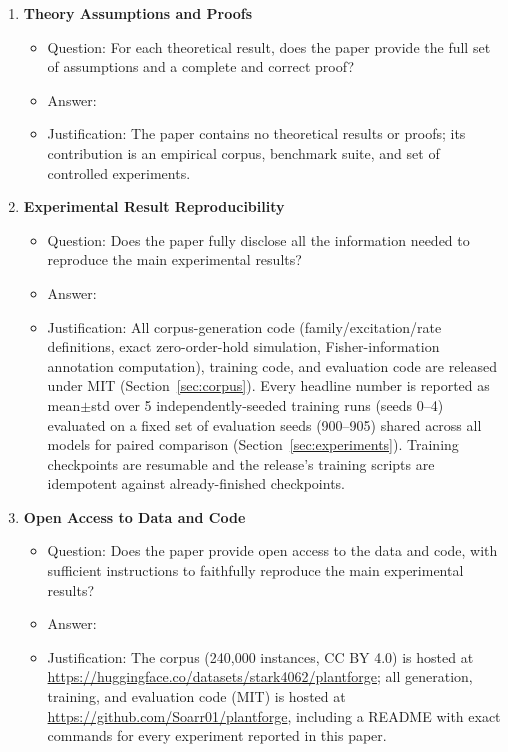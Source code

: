 \documentclass{article}
\begin{document}
\begin{enumerate}
\item {\bf Theory Assumptions and Proofs}
  \begin{itemize}
    \item Question: For each theoretical result, does the paper provide the full set of assumptions and a complete and correct proof?
    \item Answer: \answerNA{}
    \item Justification: The paper contains no theoretical results or proofs; its contribution is an empirical corpus, benchmark suite, and set of controlled experiments.
  \end{itemize}

\item {\bf Experimental Result Reproducibility}
  \begin{itemize}
    \item Question: Does the paper fully disclose all the information needed to reproduce the main experimental results?
    \item Answer: \answerYes{}
    \item Justification: All corpus-generation code (family/excitation/rate definitions, exact zero-order-hold simulation, Fisher-information annotation computation), training code, and evaluation code are released under MIT (Section~\ref{sec:corpus}). Every headline number is reported as mean$\pm$std over 5 independently-seeded training runs (seeds 0--4) evaluated on a fixed set of evaluation seeds (900--905) shared across all models for paired comparison (Section~\ref{sec:experiments}). Training checkpoints are resumable and the release's training scripts are idempotent against already-finished checkpoints.
  \end{itemize}

\item {\bf Open Access to Data and Code}
  \begin{itemize}
    \item Question: Does the paper provide open access to the data and code, with sufficient instructions to faithfully reproduce the main experimental results?
    \item Answer: \answerYes{}
    \item Justification: The corpus (240{,}000 instances, CC BY 4.0) is hosted at \url{https://huggingface.co/datasets/stark4062/plantforge}; all generation, training, and evaluation code (MIT) is hosted at \url{https://github.com/Soarr01/plantforge}, including a README with exact commands for every experiment reported in this paper.
  \end{itemize}


\end{enumerate}
\end{document}
